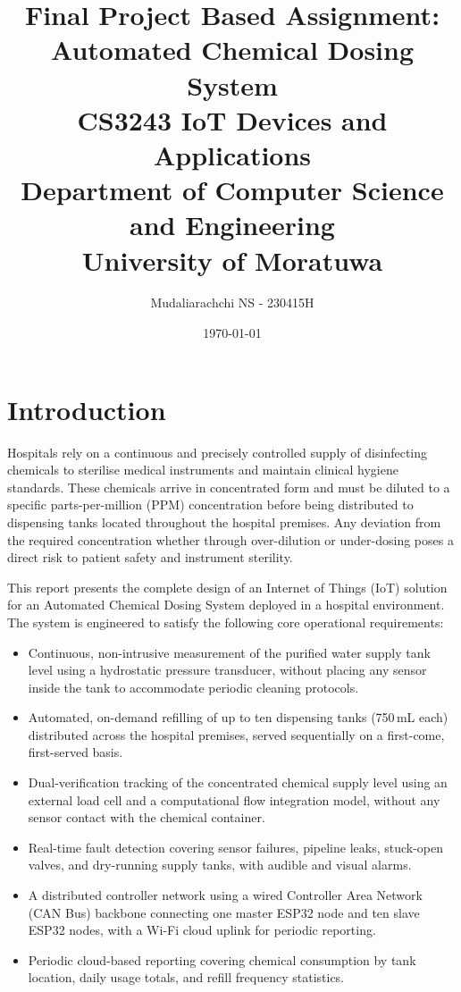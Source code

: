 \documentclass[12pt,a4paper]{article}
\title{
    \vspace{2cm}
    \textbf{ Final Project Based Assignment: Automated Chemical Dosing System\\ 
    CS3243 IoT Devices and Applications } \\ 
    \vspace{4cm}
    \large Department of Computer Science and Engineering \\
    University of Moratuwa\\
    \vspace{1.5cm}
}
\author{
     Mudaliarachchi NS - 230415H  \\
    \vspace{1cm}
}
\date{\today}
\begin{document}
\maketitle

\newpage
\newpage
\tableofcontents
\newpage
\section{Introduction}

Hospitals rely on a continuous and precisely controlled supply of disinfecting chemicals to sterilise medical instruments and maintain clinical hygiene standards. These chemicals arrive in concentrated form and must be diluted to a specific parts-per-million (PPM) concentration before being distributed to dispensing tanks located throughout the hospital premises. Any deviation from the required concentration  whether through over-dilution or under-dosing poses a direct risk to patient safety and instrument sterility.

This report presents the complete design of an Internet of Things (IoT) solution for an Automated Chemical Dosing System deployed in a hospital environment. The system is engineered to satisfy the following core operational requirements:

\begin{itemize}
    \item Continuous, non-intrusive measurement of the purified water supply tank level using a hydrostatic pressure transducer, without placing any sensor inside the tank to accommodate periodic cleaning protocols.
    \item Automated, on-demand refilling of up to ten dispensing tanks (750\,mL each) distributed across the hospital premises, served sequentially on a first-come, first-served basis.
    \item Dual-verification tracking of the concentrated chemical supply level using an external load cell and a computational flow integration model, without any sensor contact with the chemical container.
    \item Real-time fault detection covering sensor failures, pipeline leaks, stuck-open valves, and dry-running supply tanks, with audible and visual alarms.
    \item A distributed controller network using a wired Controller Area Network (CAN Bus) backbone connecting one master ESP32 node and ten slave ESP32 nodes, with a Wi-Fi cloud uplink for periodic reporting.
    \item Periodic cloud-based reporting covering chemical consumption by tank location, daily usage totals, and refill frequency statistics.
\end{itemize}
\end{document}
